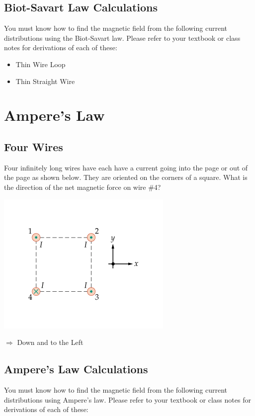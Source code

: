 \documentclass[11pt]{article}
\begin{document}
\subsection{Biot-Savart Law Calculations}
You must know how to find the magnetic field from the following current distributions using the Biot-Savart law.  Please refer to your textbook or class notes for derivations of each of these:

\begin{itemize}
\item Thin Wire Loop
\item Thin Straight Wire
\end{itemize}


\pagebreak
\section{Ampere's Law}
\vspace{10pt}

\subsection{Four Wires}
Four infinitely long wires have each have a current going into the page or out of the page as shown below.  They are oriented on the corners of a square.  What is the direction of the net magnetic force on wire \#4?

\begin{center}
\includegraphics[scale=0.5]{Images/four_wires.png}
\end{center}

$\Rightarrow$ Down and to the Left

\subsection{Ampere's Law Calculations}
You must know how to find the magnetic field from the following current distributions using Ampere's law.  Please refer to your textbook or class notes for derivations of each of these:
\end{document}
